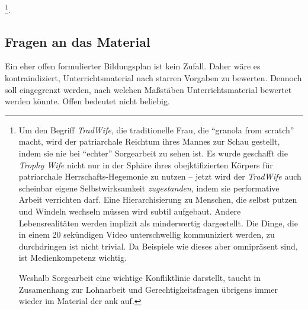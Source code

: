 

\footnote{
    Um den Begriff \emph{TradWife}, die traditionelle Frau, die \enquote{granola from scratch} macht, wird der patriarchale Reichtum ihres Mannes zur Schau gestellt, indem sie nie bei \enquote{echter} Sorgearbeit zu sehen ist. Es wurde geschafft die \emph{Trophy Wife} nicht nur in der Sphäre ihres obejktifizierten Körpers für patriarchale Herrschafts-Hegemonie zu nutzen -- jetzt wird der \emph{TradWife} auch scheinbar eigene Selbstwirksamkeit \emph{zugestanden}, indem sie performative Arbeit verrichten darf. Eine Hierarchisierung zu Menschen, die selbst putzen und Windeln wechseln müssen wird subtil aufgebaut. Andere Lebensrealitäten werden implizit als minderwertig dargestellt. Die Dinge, die in einem 20 sekündigen Video unterschwellig kommuniziert werden, zu durchdringen ist nicht trivial. Da Beispiele wie dieses aber omnipräsent sind, ist Medienkompetenz wichtig. 
    
    \noindent Weshalb Sorgearbeit eine wichtige Konfliktlinie darstellt, taucht in Zusamenhang zur Lohnarbeit und Gerechtigkeitsfragen übrigens immer wieder im Material der \gls{ank} auf.
}. 







\subsection{Fragen an das Material} %
Ein eher offen formulierter Bildungsplan ist kein Zufall. %
Daher wäre es kontraindiziert, Unterrichtsmaterial nach starren Vorgaben zu bewerten.
Dennoch soll eingegrenzt werden, nach welchen Maßstäben Unterrichtsmaterial bewertet werden könnte. Offen bedeutet nicht beliebig.

